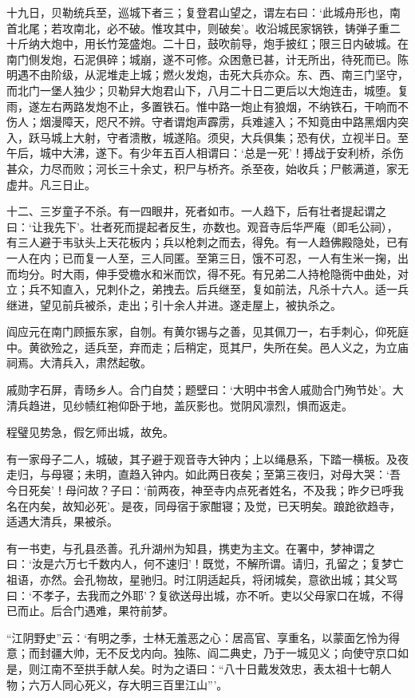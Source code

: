 \documentclass[]{article}
\begin{document}
十九日，贝勒统兵至，巡城下者三；复登君山望之，谓左右曰：`此城舟形也，南首北尾；若攻南北，必不破。惟攻其中，则破矣'。收沿城民家锅铁，铸弹子重二十斤纳大炮中，用长竹笼盛炮。二十日，鼓吹前导，炮手披红；限三日内破城。在南门侧发炮，石泥俱碎；城崩，遂不可修。众困惫已甚，计无所出，待死而已。陈明遇不由阶级，从泥堆走上城；燃火发炮，击死大兵亦众。东、西、南三门坚守，而北门一堡人独少；贝勒舁大炮君山下，八月二十日二更后以大炮连击，城堕。复雨，遂左右两路发炮不止，多置铁石。惟中路一炮止有狼烟，不纳铁石，干响而不伤人；烟漫障天，咫尺不辨。守者谓炮声霹雳，兵难遽入；不知竟由中路黑烟内突入，跃马城上大射，守者溃散，城遂陷。须臾，大兵俱集；恐有伏，立视半日。至午后，城中大沸，遂下。有少年五百人相谓曰：`总是一死'！搏战于安利桥，杀伤甚众，力尽而败；河长三十余丈，积尸与桥齐。杀至夜，始收兵；尸骸满道，家无虚井。凡三日止。

十二、三岁童子不杀。有一四眼井，死者如市。一人趋下，后有壮者提起谓之曰：`让我先下'。壮者死而提起者反生，亦数也。观音寺后华严庵（即毛公祠），有三人避于韦驮头上天花板内；兵以枪刺之而去，得免。有一人趋佛殿隐处，已有一人在内；已而复一人至，三人同匿。至第三日，饿不可忍，一人有生米一掬，出而均分。时大雨，伸手受檐水和米而饮，得不死。有兄弟二人持枪隐衖中曲处，对立；兵不知直入，兄刺仆之，弟拽去。后兵继至，复如前法，凡杀十六人。适一兵继进，望见前兵被杀，走出；引十余人并进。遂走屋上，被执杀之。

阎应元在南门顾振东家，自刎。有黄尔锡与之善，见其佩刀一，右手刺心，仰死庭中。黄欲殓之，适兵至，弃而走；后稍定，觅其尸，失所在矣。邑人义之，为立庙祠焉。大清兵入，肃然起敬。

戚勋字石屏，青旸乡人。合门自焚；题壁曰：`大明中书舍人戚勋合门殉节处'。大清兵趋进，见纱帻红袍仰卧于地，盖灰影也。觉阴风凛烈，惧而返走。

程璧见势急，假乞师出城，故免。

有一家母子二人，城破，其子避于观音寺大钟内；上以绳悬系，下踏一横板。及夜走归，与母寝；未明，直趋入钟内。如此两日夜矣；至第三夜归，对母大哭：`吾今日死矣'！母问故？子曰：`前两夜，神至寺内点死者姓名，不及我；昨夕已呼我名在内矣，故知必死'。是夜，同母宿于家酣寝；及觉，已天明矣。踉跄欲趋寺，适遇大清兵，果被杀。

有一书吏，与孔县丞善。孔升湖州为知县，携吏为主文。在署中，梦神谓之曰：`汝是六万七千数内人，何不速归'！既觉，不解所谓。请归，孔留之；复梦亡祖语，亦然。会孔物故，星驰归。时江阴适起兵，将闭城矣，意欲出城；其父骂曰：`不孝子，去我而之外耶'？复欲送母出城，亦不听。吏以父母家口在城，不得已而止。后合门遇难，果符前梦。

``江阴野史''云：`有明之季，士林无羞恶之心：居高官、享重名，以蒙面乞怜为得意；而封疆大帅，无不反戈内向。独陈、阎二典史，乃于一城见义；向使守京口如是，则江南不至拱手献人矣。时为之语曰：``八十日戴发效忠，表太祖十七朝人物；六万人同心死义，存大明三百里江山'''。
\end{document}
